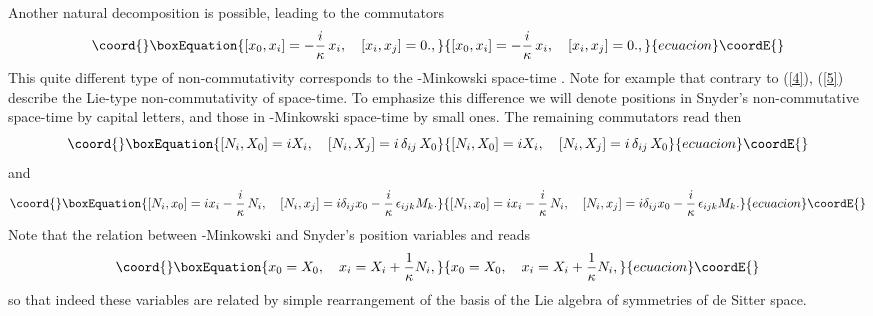 \documentclass  [12pt] {article}
\begin{document}
Another natural decomposition is possible, leading to the commutators
\begin{equation}\coord{}\boxEquation{\label{5}
  [x_0, x_i] = -\frac{i}{\kappa}\, x_i, \quad [x_i, x_j] = 0.,
}{[x_0, x_i] = -\frac{i}{\kappa}\, x_i, \quad [x_i, x_j] = 0.,
}{ecuacion}\coordE{}\end{equation}
This quite different type of non-commutativity corresponds to the
\myHighlight{$\kappa$}\coordHE{}-Minkowski space-time \cite{kappaM}. Note for example that contrary to
(\ref{4}), (\ref{5}) describe the Lie-type non-commutativity of space-time. To
emphasize this difference we will denote positions in Snyder's non-commutative
space-time by capital letters, and those in \myHighlight{$\kappa$}\coordHE{}-Minkowski space-time by
small ones. The remaining \coordHE{} commutators read then
\begin{equation}\coord{}\boxEquation{\label{6a}
 [N_i, X_0] = i X_i, \quad [N_i, X_j] = i\, \delta_{ij}\, X_0
}{[N_i, X_0] = i X_i, \quad [N_i, X_j] = i\, \delta_{ij}\, X_0
}{ecuacion}\coordE{}\end{equation}
and
\begin{equation}\coord{}\boxEquation{\label{6b}
 [N_i, x_0] = i x_i - \frac{i}\kappa\,  N_i, \quad [N_i, x_j]=i \delta_{ij} x_0 - \frac{i}\kappa\, \epsilon_{ijk} M_k.
}{[N_i, x_0] = i x_i - \frac{i}\kappa\,  N_i, \quad [N_i, x_j]=i \delta_{ij} x_0 - \frac{i}\kappa\, \epsilon_{ijk} M_k.
}{ecuacion}\coordE{}\end{equation}
 Note that the relation between \myHighlight{$\kappa$}\coordHE{}-Minkowski and Snyder's position variables \coordHE{} and \coordHE{} reads
\begin{equation}\coord{}\boxEquation{\label{7}
 x_0 = X_0, \quad x_i = X_i + \frac1\kappa N_i,
}{x_0 = X_0, \quad x_i = X_i + \frac1\kappa N_i,
}{ecuacion}\coordE{}\end{equation}
so that indeed these variables are related by simple rearrangement of the basis
of the Lie algebra \coordHE{} of symmetries of de Sitter space.
\end{document}
